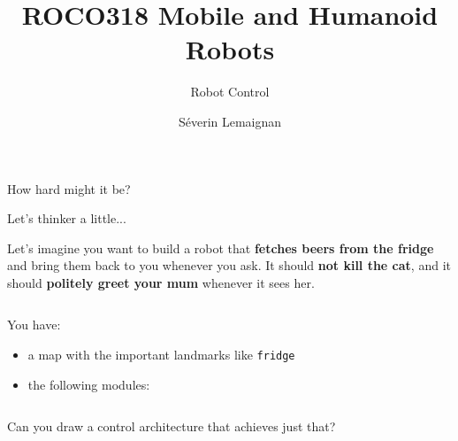 \documentclass[compress]{beamer}
\title{ROCO318 \newline Mobile and Humanoid Robots}
\subtitle{Robot Control}
\date{}
\author{Séverin Lemaignan}
\institute{Centre for Neural Systems and Robotics\\{\bf Plymouth University}}
\begin{document}

\maketitle

\begin{frame}[plain]{}

    \Large

    \centering
    How hard might it be?

\end{frame}


\begin{frame}{Let's thinker a little...}

    Let's imagine you want to build a robot that {\bf fetches beers from the fridge}
    and bring them back to you whenever you ask. It should {\bf not kill the cat},
    and it should {\bf politely greet your mum} whenever it sees her.

    \begin{columns}
        \begin{column}{0.5\linewidth}

            You have:
            \begin{itemize}
                \item a map with the important landmarks like {\tt fridge}
                \item the following modules:
            \end{itemize}
        \end{column}
        \begin{column}{0.5\linewidth}
            \begin{center}
            \end{center}
        \end{column}
    \end{columns}

    Can you draw a control architecture that achieves just that?
\end{frame}
\end{document}
